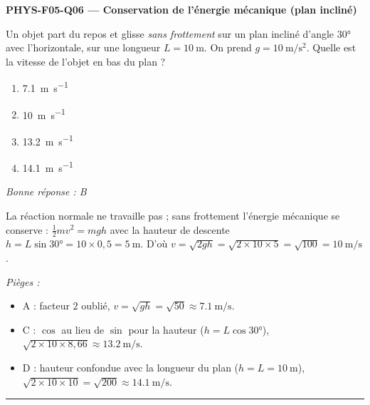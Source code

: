 \documentclass[11pt,a4paper]{article}
\begin{document}
\noindent\textbf{PHYS-F05-Q06 --- Conservation de l'énergie mécanique (plan incliné)}\par
Un objet part du repos et glisse \emph{sans frottement} sur un plan incliné d'angle $\ang{30}$ avec
l'horizontale, sur une longueur $L=\qty{10}{\metre}$. On prend $g=\qty{10}{\metre\per\second\squared}$.
Quelle est la vitesse de l'objet en bas du plan ?
\begin{center}
\end{center}
\begin{enumerate}[label=\Alph*)]
\item \qty{7.1}{\metre\per\second}
\item \qty{10}{\metre\per\second}
\item \qty{13.2}{\metre\per\second}
\item \qty{14.1}{\metre\per\second}
\end{enumerate}
\textit{Bonne réponse : B}\par
La réaction normale ne travaille pas ; sans frottement l'énergie mécanique se conserve :
$\tfrac12 m v^2=mgh$ avec la hauteur de descente $h=L\sin\ang{30}=10\times0{,}5=\qty{5}{\metre}$.
D'où $v=\sqrt{2gh}=\sqrt{2\times10\times5}=\sqrt{100}=\qty{10}{\metre\per\second}$.\par
\textit{Pièges :}
\begin{itemize}
\item A : facteur $2$ oublié, $v=\sqrt{gh}=\sqrt{50}\approx\qty{7.1}{\metre\per\second}$.
\item C : $\cos$ au lieu de $\sin$ pour la hauteur ($h=L\cos\ang{30}$), $\sqrt{2\times10\times8{,}66}\approx\qty{13.2}{\metre\per\second}$.
\item D : hauteur confondue avec la longueur du plan ($h=L=\qty{10}{\metre}$), $\sqrt{2\times10\times10}=\sqrt{200}\approx\qty{14.1}{\metre\per\second}$.
\end{itemize}
\vspace{8pt}\hrule\vspace{8pt}
\end{document}
